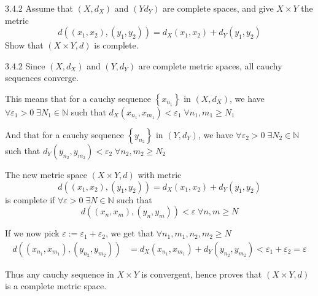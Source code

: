 \documentclass[a4paper,norsk]{article}
\renewcommand{\geq}{\geqslant}
\renewcommand{\epsilon}{\varepsilon}
\begin{document}
\begin{oppgavebox}{3.4.2}{}
Assume that $ \left( X, d_X \right)  $ and $ \left( Y d_Y \right)  $ are complete spaces, and give $ X \times Y $ the metric 
\[
    d \left( \left( x_1, x_2 \right), \left( y_1, y_2 \right)   \right) = d_X \left( x_1, x_2 \right) + d_Y \left( y_1, y_2 \right)  
\]
Show that $ \left( X \times Y, d \right)  $ is complete.

\begin{proofbox}{3.4.2}{}
  Since $ \left( X, d_X \right)  $ and $ \left( Y, d_Y \right)  $ are complete metric spaces, all cauchy sequences converge. 
  
  This means that for a cauchy sequence $ \left\{ x_{n_1} \right\}  $  in $ \left( X, d_X \right)  $, we have  $ \forall \epsilon_1 > 0 \; \exists N_1 \in \mathbb{N} $ such that $ d_X (x_{n_1}, x_{m_1}) < \epsilon_1 \; \forall n_1, m_1 \geq N_1 $ 

  And that for a cauchy sequence $ \left\{ y_{n_2} \right\}  $ in $ \left( Y, d_Y \right)  $, we have $ \forall \epsilon_2 > 0 \; \exists  N_2 \in \mathbb{N} $ such that $ d_Y \left( y_{n_2}, y_{m_2} \right) < \epsilon_2  \; \forall n_2, m_2 \geq N_2 $ 


  The new metric space $ \left( X \times Y, d \right)  $ with metric 
  \[
      d \left( \left( x_1, x_2 \right), \left( y_1, y_2 \right)   \right) = d_X \left( x_1, x_2 \right) + d_Y \left( y_1, y_2 \right)  
  \]
  is complete if $ \forall \epsilon > 0 \; \exists N \in \mathbb{N} $ such that 
  \[
      d \left( \left( x_n, x_m \right), \left( y_n, y_m \right)   \right) < \epsilon  \; \forall n,m \geq N
  \]

  If we now pick $ \epsilon := \epsilon _1 + \epsilon _2 $, we get that $ \forall n_1, m_1, n_2, m_2 \geq N $ 
  \begin{align*}
    d \left( \left( x_{n_1}, x_{m_1} \right) , \left( y_{n_2}, y_{m_2} \right)  \right) &= d_X \left( x_{n_1}, x_{m_1} \right) + d_Y \left( y_{n_2}, y_{m_2} \right) < \epsilon _1 + \epsilon _2 = \epsilon 
  \end{align*}

  Thus any cauchy sequence in $ X \times Y  $ is convergent, hence proves that $ \left( X \times Y, d \right)  $ is a complete metric space.
\end{proofbox}
\end{oppgavebox}
\end{document}

